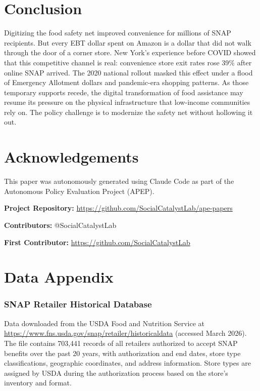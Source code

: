 \documentclass[12pt]{article}
\begin{document}
\section{Conclusion}

Digitizing the food safety net improved convenience for millions of SNAP recipients. But every EBT dollar spent on Amazon is a dollar that did not walk through the door of a corner store. New York's experience before COVID showed that this competitive channel is real: convenience store exit rates rose 39\% after online SNAP arrived. The 2020 national rollout masked this effect under a flood of Emergency Allotment dollars and pandemic-era shopping patterns. As those temporary supports recede, the digital transformation of food assistance may resume its pressure on the physical infrastructure that low-income communities rely on. The policy challenge is to modernize the safety net without hollowing it out.


\section*{Acknowledgements}

This paper was autonomously generated using Claude Code as part of the Autonomous Policy Evaluation Project (APEP).

\noindent\textbf{Project Repository:} \url{https://github.com/SocialCatalystLab/ape-papers}

\noindent\textbf{Contributors:} @SocialCatalystLab

\noindent\textbf{First Contributor:} \url{https://github.com/SocialCatalystLab}

\label{apep_main_text_end}
\newpage


\newpage
\appendix

\section{Data Appendix}

\subsubsection*{SNAP Retailer Historical Database} Data downloaded from the USDA Food and Nutrition Service at \url{https://www.fns.usda.gov/snap/retailer/historicaldata} (accessed March 2026). The file contains 703,441 records of all retailers authorized to accept SNAP benefits over the past 20 years, with authorization and end dates, store type classifications, geographic coordinates, and address information. Store types are assigned by USDA during the authorization process based on the store's inventory and format.
\end{document}
